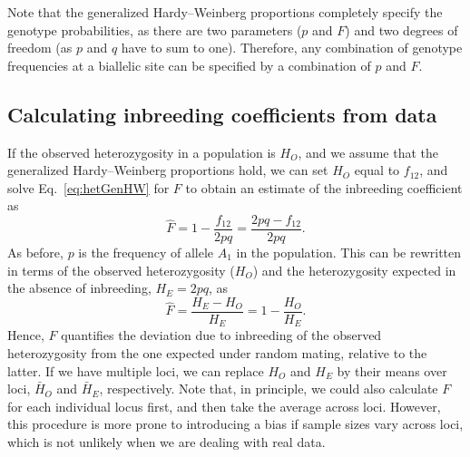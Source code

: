 Note that the generalized Hardy--Weinberg proportions completely
specify the genotype probabilities, as there are two parameters ($p$ and $F$)
and two degrees of freedom (as $p$ and $q$ have to sum to one).
Therefore, any combination of genotype frequencies at a biallelic site
can be specified by a combination of $p$ and $F$.\\


\subsection{Calculating inbreeding coefficients from data}
If the observed heterozygosity in a population is $H_O$, and we assume that the generalized Hardy--Weinberg proportions hold, we can set $H_O$ equal to $f_{12}$, and solve Eq.\ \eqref{eq:hetGenHW} for $F$ to obtain an estimate of the inbreeding coefficient as
\begin{equation}
\hat{F} = 1-\frac{f_{12}}{2pq} = \frac{2pq - f_{12}}{2pq}.
\label{eqn:Fhat}
\end{equation}
As before, $p$ is the frequency of allele $A_{1}$ in the
population. This can be rewritten in terms of the observed heterozygosity ($H_O$)
and the heterozygosity expected in the absence of inbreeding, $H_E=2pq$, as
\begin{equation}
\hat{F} = \frac{H_E-H_O}{H_E} = 1 - \frac{H_O}{H_E}.
\label{eqn:FhatHO}
\end{equation}
Hence, $F$ quantifies the deviation due to inbreeding of the observed heterozygosity from the one expected under random mating, relative to the latter.
If we have multiple loci, we can replace $H_O$ and $H_E$ by their means
over loci, $\bar{H}_O$ and $\bar{H}_E$, respectively. Note that, in principle, we could also calculate $F$ for each individual locus first, and then take the average across loci. However, this procedure is more prone to introducing a bias if sample sizes vary across loci, which is not unlikely when we are dealing with real data.\\




